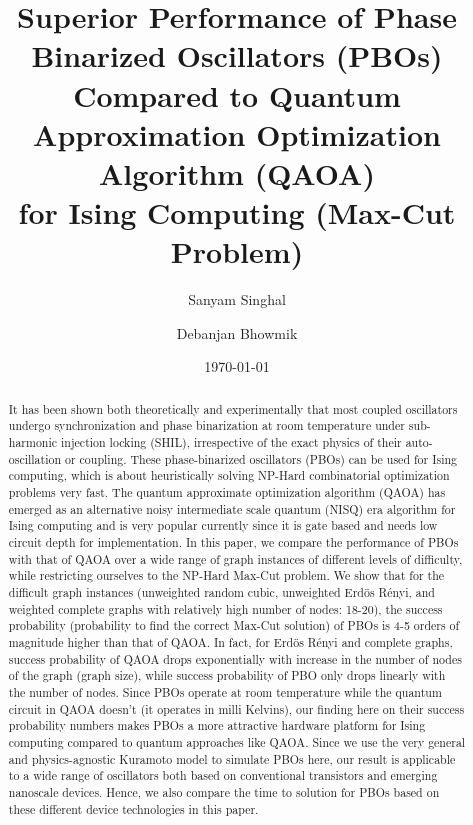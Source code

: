 \documentclass[%
 reprint,
 amsmath,amssymb,
 aps,
]{revtex4-2}
\begin{document}

\title{Superior Performance of Phase Binarized Oscillators (PBOs) \\ Compared to Quantum Approximation Optimization Algorithm (QAOA) \\ for Ising Computing (Max-Cut Problem)}%


\author{Sanyam Singhal}
\author{Debanjan Bhowmik}%
%



\date{\today}%

\begin{abstract}
It has been shown both theoretically and experimentally that most coupled oscillators undergo synchronization and phase binarization at room temperature under sub-harmonic injection locking (SHIL), irrespective of the exact physics of their auto-oscillation or coupling. These phase-binarized oscillators (PBOs) can be used for Ising computing, which is about heuristically solving NP-Hard combinatorial optimization problems very fast. The quantum approximate optimization algorithm (QAOA) has emerged as an alternative noisy intermediate scale quantum (NISQ) era algorithm for Ising computing and is very popular currently since it is gate based and needs low circuit depth for implementation. In this paper, we compare the performance of PBOs with that of QAOA over a wide range of graph instances of different levels of difficulty, while restricting ourselves to the NP-Hard Max-Cut problem. We show that for the difficult graph instances (unweighted random cubic, unweighted Erd{\"o}s R{\'e}nyi, and weighted complete graphs with relatively high number of nodes: 18-20), the success probability (probability to find the correct Max-Cut solution) of PBOs is 4-5 orders of magnitude higher than that of QAOA. In fact, for Erd{\"o}s R{\'e}nyi and complete graphs, success probability of QAOA drops exponentially with increase in the number of nodes of the graph (graph size), while success probability of PBO only drops linearly with the number of nodes. Since PBOs operate at room temperature while the quantum circuit in QAOA doesn't (it operates in milli Kelvins), our finding here on their success probability numbers makes PBOs a more attractive hardware platform for Ising computing compared to quantum approaches like QAOA. Since we use the very general and physics-agnostic Kuramoto model to simulate PBOs here, our result is applicable to a wide range of oscillators both based on conventional transistors and emerging nanoscale devices. Hence, we also compare the time to solution for PBOs based on these different device technologies in this paper.
\end{abstract}
\end{document}
